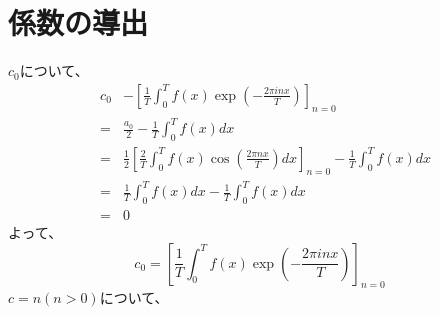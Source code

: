 \documentclass[a4paper]{jsarticle}
\begin{document}
\section{係数の導出}
$c_0$について、
\begin{eqnarray}
	& c_0 & - \left[ \frac { 1 } { T } \int _0 ^T f \left( x \right) \exp \left( - \frac { 2 \pi inx } { T } \right) \right] _{ n = 0 } \nonumber \\
	&=& \frac { a_0 } { 2 } - \frac { 1 } { T } \int _0 ^T f \left( x \right) dx \nonumber \\
	&=& \frac { 1 } { 2 } \left[ \frac { 2 } { T } \int _0 ^T f \left( x \right) \cos \left( \frac { 2 \pi nx } { T } \right) dx \right] _{ n = 0 } - \frac { 1 } { T } \int _0 ^T f \left( x \right) dx \nonumber \\
	&=& \frac { 1 } { T } \int _0 ^T f \left( x \right) dx - \frac { 1 } { T } \int _0 ^T f \left( x \right) dx \nonumber \\
	&=& 0
\end{eqnarray}
よって、
\begin{equation}
	c_0 = \left[ \frac { 1 } { T } \int _0 ^T f \left( x \right) \exp \left( - \frac { 2 \pi inx } { T } \right) \right] _{ n = 0 }
\end{equation}
$ c=n \left( n > 0 \right) $について、
\end{document}
